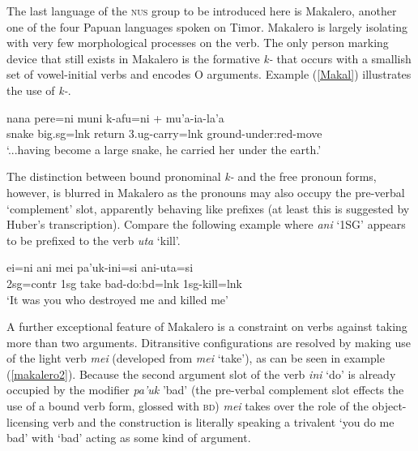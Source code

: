 The last language of the \textsc{nus} group to be introduced here is Makalero, another one of the four Papuan languages spoken on Timor. Makalero is largely isolating with very few morphological processes on the verb. The only person marking device that still exists in Makalero is the formative \textit{k-} that occurs with a smallish set of vowel-initial verbs and encodes O arguments. Example (\ref{Makal}) illustrates the use of \textit{k-}.

\ea \label{Makal}
\gll nana pere=ni muni k-afu=ni + mu’a-ia-la’a \\
snake big.\acs{sg}=\acs{lnk} return \acs{3}.\acs{ug}-carry=\acs{lnk} ground-under:\acs{red}-move \\
\glft `...having become a large snake, he carried her under the earth.’ \\ 
\z
\xe

The distinction between bound pronominal \textit{k-} and the free pronoun forms, however, is blurred in Makalero as the pronouns may also occupy the pre-verbal `complement' slot, apparently behaving like prefixes (at least this is suggested by Huber's transcription). Compare the following example where \textit{ani} `1SG' appears to be prefixed to the verb \textit{uta} `kill'.

\ea \label{makalero2}
\gll ei=ni ani mei pa’uk-ini=si ani-uta=si \\
\acs{2}\acs{sg}=\acs{contr} \acs{1}\acs{sg} take bad-do:\acs{bd}=\acs{lnk} \acs{1}\acs{sg}-kill=\acs{lnk} \\
\glft `It was you who destroyed me and killed me’ \\ 
\z
\xe

A further exceptional feature of Makalero is a constraint on verbs against taking more than two arguments. Ditransitive configurations are resolved by making use of the light verb \textit{mei} (developed from \textit{mei} `take'), as can be seen in example (\ref{makalero2}). Because the second argument slot of the verb \textit{ini} `do' is already occupied by the modifier \textit{pa'uk} 'bad' (the pre-verbal complement slot effects the use of a bound verb form, glossed with \textsc{bd}) \textit{mei} takes over the role of the object-licensing verb and the construction is literally speaking a trivalent `you do me bad' with `bad' acting as some kind of argument.

